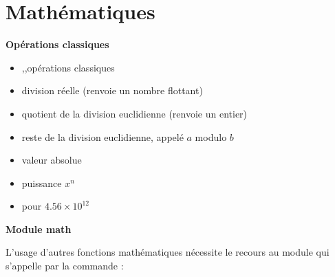 \documentclass[11pt,class=report,crop=false]{standalone}
\begin{document}


\section{Mathématiques}

\textbf{Opérations classiques}
\begin{itemize}
  \item {},\quad {},\quad {}\quad  opérations classiques
  \item {}\quad division \og{}réelle\fg{} (renvoie un nombre flottant)
  \item {}\quad quotient de la division euclidienne (renvoie un entier)
  \item {}\quad reste de la division euclidienne, appelé $a$ modulo $b$
  \item {}\quad valeur absolue
  \item {}\quad puissance $x^n$
  \item {}\quad pour $4.56 \times 10^{12}$
\end{itemize}

\bigskip

\textbf{Module \og{}math\fg{}}

L'usage d'autres fonctions mathématiques nécessite le recours au module  qui s'appelle par la commande :
\end{document}
